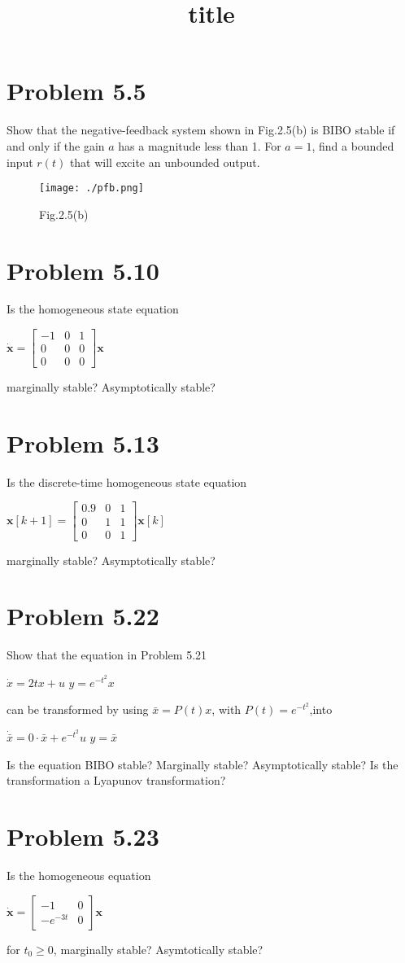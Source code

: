 \documentclass[12pt,a4paper]{article}
\title{title}
\begin{document}
\section*{Problem 5.5}
Show that the negative-feedback system shown in Fig.2.5(b) is BIBO stable if and only if the gain $a$ has a magnitude less than 1. For $a=1$, find a bounded input $r(t)$ that will excite an unbounded output.
\begin{figure}[htbp]
\centering
    \texttt{[image: ./pfb.png]}
    \caption{Fig.2.5(b)}
    \label{fig:2.5(b)}
\end{figure}

\section*{Problem 5.10}
Is the homogeneous state equation
\begin{center}
$\bm{\dot{x}}=
\begin{bmatrix}
-1 & 0 & 1\\
 0 & 0 & 0\\
 0 & 0 & 0
\end{bmatrix}
\bm{x}$
\end{center}
marginally stable? Asymptotically stable?

\section*{Problem 5.13}
Is the discrete-time homogeneous state equation
\begin{center}
$\bm{x}[k+1]=
\begin{bmatrix}
0.9 & 0 & 1\\
  0 & 1 & 1\\
  0 & 0 & 1
\end{bmatrix}
\bm{x}[k]$
\end{center}
marginally stable? Asymptotically stable?

\section*{Problem 5.22}
Show that the equation in Problem 5.21
\begin{center}
$\dot{x}=2tx+u$ \hspace{18pt} $y=e^{-t^2}x$
\end{center}
can be transformed by using $\bar{x}=P(t)x$, with $P(t)=e^{-t^2}$,into
\begin{center}
$\dot{\bar{x}}=0\cdot\bar{x}+e^{-t^2}u$ \hspace{18pt} $y=\bar{x}$
\end{center}
Is the equation BIBO stable? Marginally stable? Asymptotically stable? Is the transformation a Lyapunov transformation?

\section*{Problem 5.23}
Is the homogeneous equation
\begin{center}
$\bm{\dot{x}}=
\begin{bmatrix}
-1 & 0\\
-e^{-3t} & 0
\end{bmatrix}
\bm{x}$
\end{center}
for $t_0\geq0$, marginally stable? Asymtotically stable?
\end{document}
